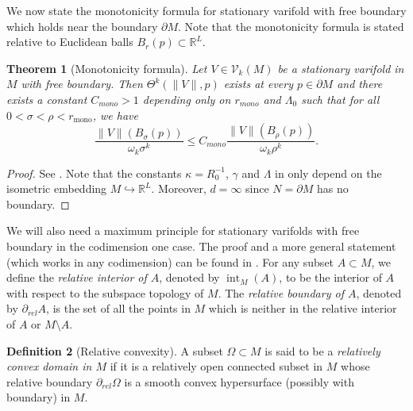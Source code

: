 \documentclass[10pt]{amsart}
\newtheorem{theorem}{Theorem}[section]
\theoremstyle{definition}
\newtheorem{definition}[theorem]{Definition}
\theoremstyle{remark}
\numberwithin{equation}{section}
\newcommand{\V}{\mathcal{V}}
\newcommand{\R}{\mathbb{R}}
\newcommand{\si}{\sigma}
\newcommand{\interior}{\operatorname{int}}
\begin{document}
We now state the monotonicity formula for stationary varifold with free boundary which holds near the boundary $\partial M$. Note that the monotonicity formula is stated relative to Euclidean balls $B_r(p) \subset \R^L$.

\begin{theorem}[Monotonicity formula]
\label{T:monotonicity}
Let $V \in \V_k(M)$ be a stationary varifold in $M$ with free boundary. 
Then $\Theta^k(\|V\|,p)$ exists at every $p \in \partial M$ and there exists a constant $C_{mono}>1$ depending only on $r_{mono}$ and $\Lambda_0$ such that for all $0 <\si < \rho <r_{\textrm{mono}}$, we have
\[   \frac{\|V\|(B_\si(p))}{\omega_k \si^k} \leq C_{mono} \frac{\|V\|(B_\rho(p))}{\omega_k \rho^k}. \]
\end{theorem}

\begin{proof}
See \cite[Theorem 3.5]{Li-Zhou-A}. Note that the constants $\kappa=R_0^{-1}$, $\gamma$ and $\Lambda$ in \cite[Theorem 3.3]{Li-Zhou-A} only depend on the isometric embedding $M \hookrightarrow \mathbb{R}^L$. Moreover, $d=\infty$ since $N=\partial M$ has no boundary.
\end{proof}


We will also need a maximum principle for stationary varifolds with free boundary in the codimension one case. The proof and a more general statement (which works in any codimension) can be found in \cite{max-principle}. For any subset $A \subset M$, we define the \emph{relative interior of $A$}, denoted by $\interior_M(A)$, to be the interior of $A$ with respect to the subspace topology of $M$. 
The \emph{relative boundary of $A$}, denoted by $\partial_{rel} A$, is the set of all the points in $M$ which is neither in the relative interior of $A$ or $M \setminus A$. 

\begin{definition}[Relative convexity]
\label{D:rel-convex}
A subset $\Omega \subset M$ is said to be a \emph{relatively convex domain in $M$} if it is a relatively open connected subset in $M$ whose relative boundary $\partial_{rel} \Omega$ is a smooth convex  %
hypersurface (possibly with boundary) in $M$. 
\end{definition}
\end{document}
